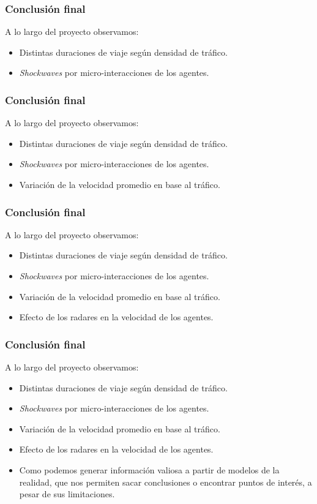 \documentclass[10pt, compress]{beamer}
\begin{document}
\begin{frame}[fragile]
\frametitle{Conclusi\'on final}

A lo largo del proyecto observamos:
\begin{itemize}
\item Distintas duraciones de viaje seg\'un densidad de tr\'afico.
\item \textit{Shockwaves} por micro-interacciones de los agentes.
\end{itemize}
\end{frame}

\begin{frame}[fragile]
\frametitle{Conclusi\'on final}

A lo largo del proyecto observamos:
\begin{itemize}
\item Distintas duraciones de viaje seg\'un densidad de tr\'afico.
\item \textit{Shockwaves} por micro-interacciones de los agentes.
\item Variaci\'on de la velocidad promedio en base al tr\'afico.
\end{itemize}
\end{frame}

\begin{frame}[fragile]
\frametitle{Conclusi\'on final}

A lo largo del proyecto observamos:
\begin{itemize}
\item Distintas duraciones de viaje seg\'un densidad de tr\'afico.
\item \textit{Shockwaves} por micro-interacciones de los agentes.
\item Variaci\'on de la velocidad promedio en base al tr\'afico.
\item Efecto de los radares en la velocidad de los agentes.
\end{itemize}
\end{frame}

\begin{frame}[fragile]
\frametitle{Conclusi\'on final}

A lo largo del proyecto observamos:
\begin{itemize}
\item Distintas duraciones de viaje seg\'un densidad de tr\'afico.
\item \textit{Shockwaves} por micro-interacciones de los agentes.
\item Variaci\'on de la velocidad promedio en base al tr\'afico.
\item Efecto de los radares en la velocidad de los agentes.
\item Como podemos generar informaci\'on valiosa a partir de modelos de la realidad, que nos permiten sacar conclusiones o encontrar puntos de inter\'es, a pesar de sus limitaciones.
\end{itemize}
\end{frame}
\end{document}
